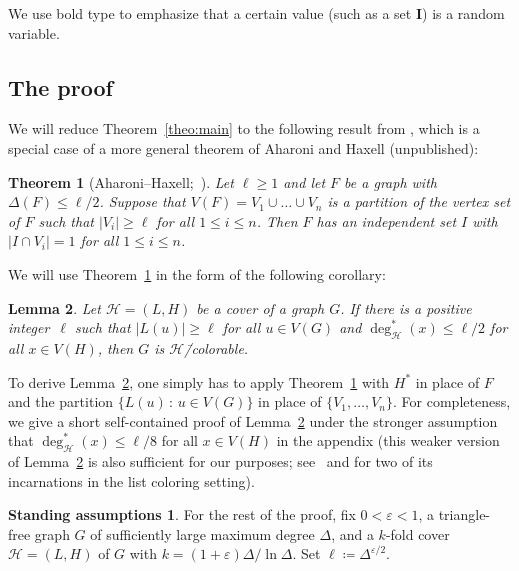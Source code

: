\documentclass[11pt, reqno, psamsfonts]{amsart}
\newtheorem{theo}{Theorem}[section]
\newtheorem{lemma}[theo]{Lemma}
\theoremstyle{definition}
\newtheorem*{assum}{Standing assumptions}
\theoremstyle{remark}
\newcommand{\0}{\varnothing}
\newcommand{\set}[1]{\{#1\}}
\renewcommand{\epsilon}{\varepsilon}
\renewcommand{\leq}{\leqslant}
\renewcommand{\geq}{\geqslant}
\newcommand{\defeq}{\coloneqq}
\newcommand{\Cov}[1]{\mathscr{#1}}
\renewcommand{\mathbf}[1]{{\bm{#1}}}
\numberwithin{equation}{section}
\newcommand{\bemph}[1]{{\upshape#1}} %
\newcommand{\ep}[1]{\bemph{(}#1\bemph{)}} %
\begin{document}
	We use bold type to emphasize that a certain value (such as a set $\mathbf{I}$) is a random variable.
	
	\subsection{The proof}
	
	We will reduce Theorem~\ref{theo:main} to the following result from \cite{Hax01},  which is a special case of a more general theorem of Aharoni and Haxell \ep{unpublished}: %
	
	\begin{theo}[{Aharoni--Haxell;~\cite[Theorem 2]{Hax01}}]\label{theo:Hax}
		Let $\ell \geq 1$ and let $F$ be a graph with $\Delta(F) \leq \ell/2$. Suppose that $V(F) = V_1 \cup \ldots \cup V_n$ is a partition of the vertex set of $F$ such that $|V_i| \geq \ell$ for all $1 \leq i \leq n$. Then $F$ has an independent set $I$ with $|I \cap V_i|=1$ for all $1 \leq i \leq n$. 
	\end{theo}
	
	We will use Theorem~\ref{theo:Hax} in the form of the following corollary:
	
	\begin{lemma}\label{lemma:small_deg}
		Let $\Cov{H} = (L, H)$ be a cover of a graph $G$. If there is a positive integer~$\ell$ such that $|L(u)| \geq \ell$ for all $u \in V(G)$ and $\deg_{\Cov{H}}^\ast(x) \leq \ell/2$ for all $x \in V(H)$, then $G$ is $\Cov{H}$\=/colorable. 
	\end{lemma}
	
	To derive Lemma~\ref{lemma:small_deg}, one simply has to apply Theorem~\ref{theo:Hax} with $H^\ast$ in place of $F$ and the partition $\set{L(u) \,:\, u \in V(G)}$ in place of $\set{V_1, \ldots, V_n}$. For completeness, we give a short self-contained proof of Lemma~\ref{lemma:small_deg} under the stronger assumption that $\deg_{\Cov{H}}^\ast(x) \leq \ell/8$ for all $x \in V(H)$ in the appendix (this weaker version of Lemma~\ref{lemma:small_deg} is also sufficient for our purposes; see~\cite[Theorem~2]{ReedList} and \cite[Lemma~5]{Mol17} for two of its incarnations in the list coloring setting).
	
	
	\begin{assum}
		For the rest of the proof, fix $0<\epsilon<1$, a triangle-free graph $G$ of sufficiently large maximum degree $\Delta$, and a $k$-fold cover $\Cov{H} = (L, H)$ of $G$ with $k = (1+\epsilon) \Delta/\ln\Delta$. Set $\ell \defeq \Delta^{\epsilon/2}$.
	\end{assum}
	
\end{document}
